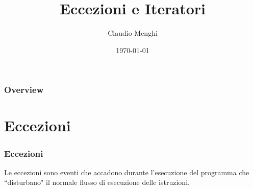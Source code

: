 \documentclass{beamer}
\title[Eccezioni]{Eccezioni e Iteratori} %
\author{Claudio Menghi} %
\institute[Polimi] %
{
Politecnico di Milano \\ %
\medskip
\textit{claudio.menghi@polimi.it} %
}
\date{\today} %
\begin{document}
\begin{frame}
\titlepage %
\end{frame}

\begin{frame}
\frametitle{Overview} %
\tableofcontents %
\end{frame}





\section{Eccezioni}

\begin{frame}
\frametitle{Eccezioni}
\begin{framed}
Le eccezioni sono eventi che accadono durante l'esecuzione del programma  che ``disturbano" il normale flusso di esecuzione delle istruzioni. 
\end{framed}
\end{frame}
\end{document}
